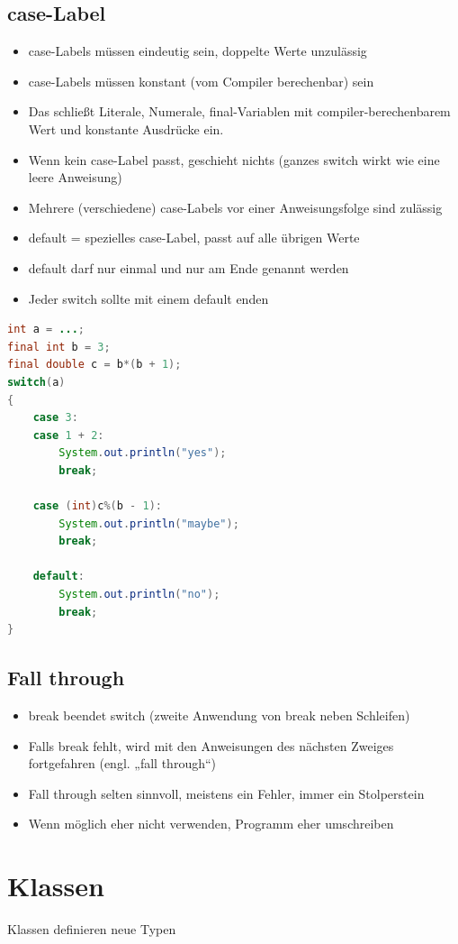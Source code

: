  \subsection{case-Label}
 \begin{itemize}
\item case-Labels müssen eindeutig sein, doppelte Werte unzulässig
\item case-Labels müssen konstant (vom Compiler berechenbar) sein
\item  Das schließt Literale, Numerale, final-Variablen mit compiler-berechenbarem Wert und konstante Ausdrücke ein.
\item Wenn kein case-Label passt, geschieht nichts (ganzes switch wirkt wie eine leere Anweisung)
\item  Mehrere (verschiedene) case-Labels vor einer Anweisungsfolge sind zulässig
\item default = spezielles case-Label, passt auf alle übrigen Werte
\item default darf nur einmal und nur am Ende genannt werden
\item Jeder switch sollte mit einem default enden
\end{itemize}
 \begin{lstlisting}[language=JAVA]
int a = ...;
final int b = 3;
final double c = b*(b + 1);
switch(a)
{
	case 3:
	case 1 + 2:
		System.out.println("yes");
		break;
		
	case (int)c%(b - 1):
		System.out.println("maybe");
		break;
		
	default:
		System.out.println("no");
		break;
}
 \end{lstlisting}
 
 \subsection{Fall through}
 \begin{itemize}
 \item break beendet switch (zweite Anwendung von break neben Schleifen)
\item Falls break fehlt, wird mit den Anweisungen des nächsten Zweiges fortgefahren (engl. „fall through“)
\item Fall through selten sinnvoll, meistens ein Fehler, immer ein Stolperstein
\item Wenn möglich eher nicht verwenden, Programm eher umschreiben
\end{itemize}
%
%
%
\section{Klassen}
Klassen definieren neue Typen

